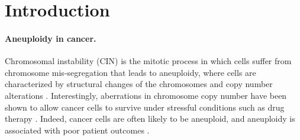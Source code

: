 \documentclass[12pt]{extarticle}
\begin{document}
\newpage
\section*{Introduction}




\paragraph{Aneuploidy in cancer.} Chromosomal instability (CIN) is the mitotic process in which cells suffer from chromosome mis-segregation that leads to aneuploidy, where cells are characterized by structural changes of the chromosomes and copy number alterations \citep{schukken2018cin}.
Interestingly, aberrations in chromosome copy number have been shown to allow cancer cells to survive under stressful conditions such as drug therapy \citep{lukow2021chromosomal,rutledge2016selective}.
Indeed, cancer cells are often likely to be aneuploid, and aneuploidy is associated with poor patient outcomes \citep{ben2020context}.
\end{document}

